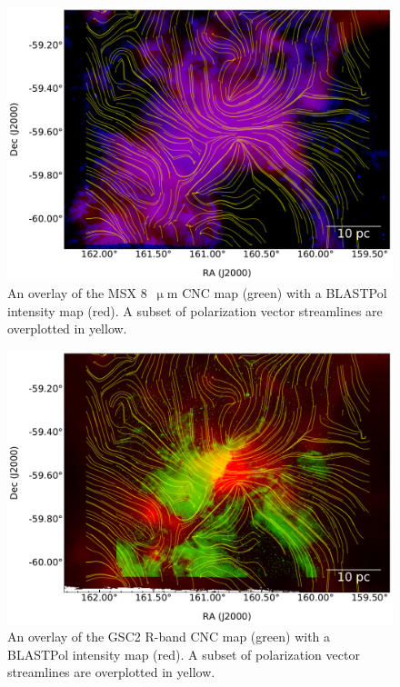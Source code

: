 \begin{figure}[!htbp]
\centering
\includegraphics[width=\textwidth]{figures/carina/msx2_sl}
\caption[An overlay of the MSX  CNC map (green) with a BLASTPol intensity map (red).]{An overlay of the MSX 8~$\upmu$m CNC map (green) \citep{smith2000large} with a BLASTPol intensity map (red). A subset of polarization vector streamlines are overplotted in yellow.}
\label{fig:msx_overplot}
\end{figure}

\begin{figure}[!htbp]
\centering
\includegraphics[width=\textwidth]{figures/carina/hstgsc2_250_sl}
\caption[An overlay of the GSC2 R-band CNC map (green) with a BLASTPol intensity map (red).]{An overlay of the GSC2 R-band CNC map (green) \citep{lasker2008second} with a BLASTPol intensity map (red). A subset of polarization vector streamlines are overplotted in yellow.}
\label{fig:hst_overplot}
\end{figure}

